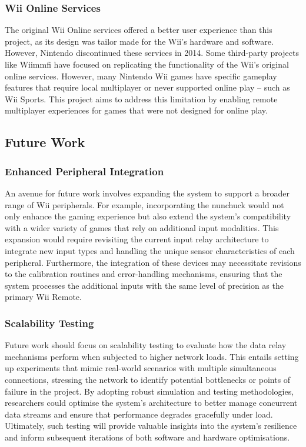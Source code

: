 \subsubsection{Wii Online Services}
The original Wii Online services offered a better user experience than this
project, as its design was tailor made for the Wii's hardware and software.
However, Nintendo discontinued these services in
2014\cite{nintendoTerminationNintendo}. Some third-party projects like Wiimmfi\cite{wiimmfi}
have focused on replicating the functionality of the Wii’s original online
services. However, many Nintendo Wii games have specific gameplay features that
require local multiplayer or never supported online play -- such as Wii Sports.
This project aims to address this limitation by enabling remote multiplayer
experiences for games that were not designed for online play.

\subsection{Future Work}

\subsubsection{Enhanced Peripheral Integration}
An avenue for future work involves expanding the system to support a broader
range of Wii peripherals. For example, incorporating the nunchuck would not only
enhance the gaming experience but also extend the system's compatibility with a
wider variety of games that rely on additional input modalities. This expansion
would require revisiting the current input relay architecture to integrate new
input types and handling the unique sensor characteristics of each peripheral.
Furthermore, the integration of these devices may necessitate revisions to the
calibration routines and error-handling mechanisms, ensuring that the system
processes the additional inputs with the same level of precision as the primary
Wii Remote.

\subsubsection{Scalability Testing}
Future work should focus on scalability testing to evaluate how the data relay
mechanisms perform when subjected to higher network loads. This entails setting
up experiments that mimic real-world scenarios with multiple simultaneous
connections, stressing the network to identify potential
bottlenecks or points of failure in the project. By adopting robust simulation and testing
methodologies, researchers could optimise the system’s architecture to better
manage concurrent data streams and ensure that performance degrades gracefully
under load. Ultimately, such testing will provide valuable insights into the
system’s resilience and inform subsequent iterations of both software and
hardware optimisations.

